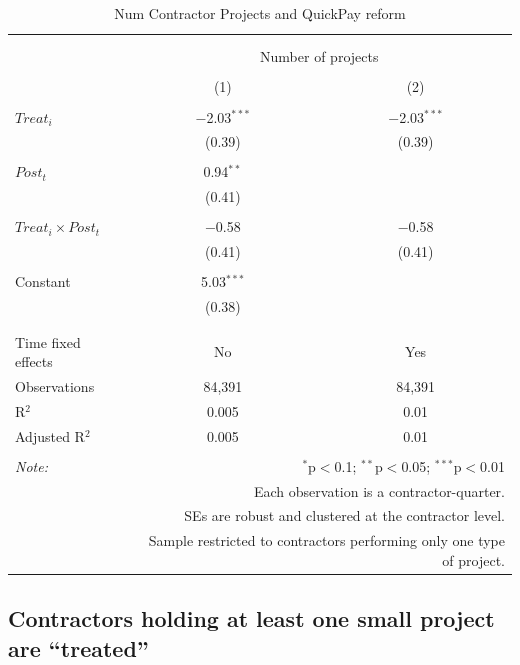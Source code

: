 \documentclass[
]{article}
\begin{document}
\begin{table}[H] \centering 
  \caption{Num Contractor Projects and QuickPay reform} 
  \label{} 
\small 
\begin{tabular}{@{\extracolsep{-2pt}}lcc} 
\\[-1.8ex]\hline 
\hline \\[-1.8ex] 
\\[-1.8ex] & \multicolumn{2}{c}{Number of projects} \\ 
\\[-1.8ex] & (1) & (2)\\ 
\hline \\[-1.8ex] 
 $Treat_i$ & $-$2.03$^{***}$ & $-$2.03$^{***}$ \\ 
  & (0.39) & (0.39) \\ 
  & & \\ 
 $Post_t$ & 0.94$^{**}$ &  \\ 
  & (0.41) &  \\ 
  & & \\ 
 $Treat_i \times Post_t$ & $-$0.58 & $-$0.58 \\ 
  & (0.41) & (0.41) \\ 
  & & \\ 
 Constant & 5.03$^{***}$ &  \\ 
  & (0.38) &  \\ 
  & & \\ 
\hline \\[-1.8ex] 
Time fixed effects & No & Yes \\ 
Observations & 84,391 & 84,391 \\ 
R$^{2}$ & 0.005 & 0.01 \\ 
Adjusted R$^{2}$ & 0.005 & 0.01 \\ 
\hline 
\hline \\[-1.8ex] 
\textit{Note:}  & \multicolumn{2}{r}{$^{*}$p$<$0.1; $^{**}$p$<$0.05; $^{***}$p$<$0.01} \\ 
 & \multicolumn{2}{r}{Each observation is a contractor-quarter.} \\ 
 & \multicolumn{2}{r}{SEs are robust and clustered at the contractor level.} \\ 
 & \multicolumn{2}{r}{Sample restricted to contractors performing only one type of project.} \\ 
\end{tabular} 
\end{table}

\hypertarget{contractors-holding-at-least-one-small-project-are-treated}{%
\subsection{Contractors holding at least one small project are
``treated''}\label{contractors-holding-at-least-one-small-project-are-treated}}
\end{document}
